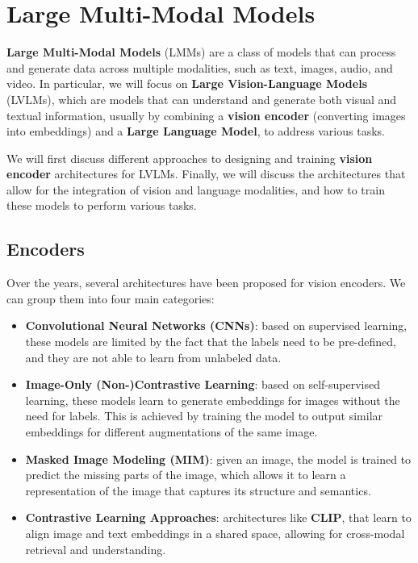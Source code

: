 \section{Large Multi-Modal Models}

\textbf{Large Multi-Modal Models} (LMMs) are a class of models that can process and generate data across multiple modalities, such as text, images, audio, and video. 
In particular, we will focus on \textbf{Large Vision-Language Models} (LVLMs), which are models that can understand and generate both visual and textual information, 
usually by combining a \textbf{vision encoder} (converting images into embeddings) and a \textbf{Large Language Model}, to address various tasks.

We will first discuss different approaches to designing and training \textbf{vision encoder} architectures for LVLMs.
Finally, we will discuss the architectures that allow for the integration of vision and language modalities, and how to train these models to perform various tasks.

\subsection{Encoders}
Over the years, several architectures have been proposed for vision encoders. We can group them into four main categories: 
\begin{itemize}
    \item \textbf{Convolutional Neural Networks (CNNs)}: based on supervised learning, these models are limited by the fact that the labels need to be pre-defined, and they are not able to learn from unlabeled data.
    \item \textbf{Image-Only (Non-)Contrastive Learning}: based on self-supervised learning, these models learn to generate embeddings for images without the need for labels.
    This is achieved by training the model to output similar embeddings for different augmentations of the same image.
    \item \textbf{Masked Image Modeling (MIM)}: given an image, the model is trained to predict the missing parts of the image, which allows it to learn a representation of the image that captures its structure and semantics.
    \item \textbf{Contrastive Learning Approaches}: architectures like \textbf{CLIP}, that learn to align image and text embeddings in a shared space, allowing for cross-modal retrieval and understanding.
\end{itemize}

